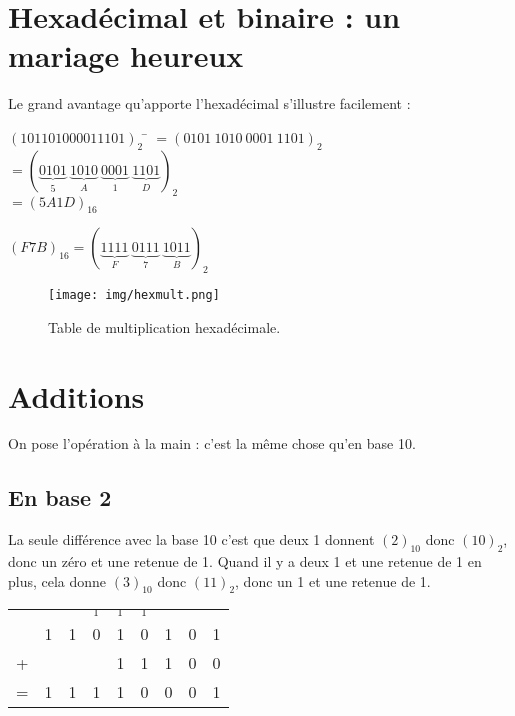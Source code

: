 \section{Hexadécimal et binaire : un mariage heureux}
Le grand avantage qu'apporte l'hexadécimal s'illustre facilement :

\begin{methode}
    \begin{tabbing}
        $(101101000011101)_2$	\=	$=(0101\ 1010\ 0001\ 1101)_2$\\
        \>	$=\left(\underbrace{0101}_5\ \underbrace{1010}_A\ \underbrace{0001}_1\ \underbrace{1101}_D\right)_2$\\
        \>	$=(5A1D)_{16}$
    \end{tabbing}
\end{methode}

\begin{methode}
    $(F7B)_{16}=\left(\underbrace{1111}_F\ \underbrace{0111}_7\ \underbrace{1011}_B\right)_2$
\end{methode}
\begin{figure}
    \begin{center}
        \texttt{[image: img/hexmult.png]}\\
        \caption*{Table de multiplication hexadécimale.}
    \end{center}
\end{figure}


\section{Additions}

On pose l'opération à la main : c'est la même chose qu'en base 10.
\subsection*{En base 2}
La seule différence avec la base 10 c'est que deux 1 donnent $(2)_{10}$ donc $(10)_2$, donc un zéro et une retenue de 1.
Quand il y a deux 1 et une retenue de 1 en plus, cela donne $(3)_{10}$ donc $(11)_2$, donc un 1 et une retenue de 1.

\begin{exemple}[]
    \begin{center}
        \begin{tabular}{ccccccccc}
              &   &   & $_1$ & $_1$ & $_1$ &   &   &   \\
              & 1 & 1 & 0    & 1    & 0    & 1 & 0 & 1 \\
            + &   &   &      & 1    & 1    & 1 & 0 & 0 \\
            \hline
            = & 1 & 1 & 1    & 1    & 0    & 0 & 0 & 1 \\
        \end{tabular} \\[2em]
    \end{center}
\end{exemple}

